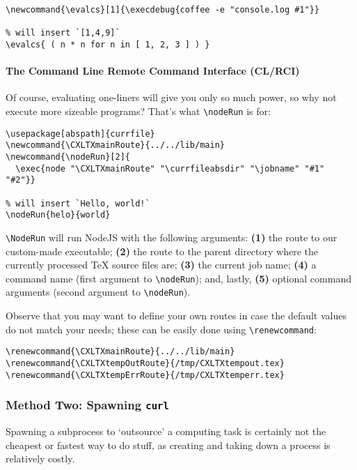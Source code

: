\begin{verbatim}
\newcommand{\evalcs}[1]{\execdebug{coffee -e "console.log #1"}}

% will insert `[1,4,9]`
\evalcs{ ( n * n for n in [ 1, 2, 3 ] ) }
\end{verbatim}

\paragraph{The Command Line Remote Command Interface
(CL/RCI)}\label{the-command-line-remote-command-interface-clrci}

Of course, evaluating one-liners will give you only so much power, so
why not execute more sizeable programs? That's what
\texttt{\textbackslash{}nodeRun} is for:

\begin{verbatim}
\usepackage[abspath]{currfile}
\newcommand{\CXLTXmainRoute}{../../lib/main}
\newcommand{\nodeRun}[2]{
  \exec{node "\CXLTXmainRoute" "\currfileabsdir" "\jobname" "#1" "#2"}}

% will insert `Hello, world!`
\nodeRun{helo}{world}
\end{verbatim}

\texttt{\textbackslash{}NodeRun} will run NodeJS with the following
arguments: \textbf{(1)} the route to our custom-made executable;
\textbf{(2)} the route to the parent directory where the currently
processed TeX source files are; \textbf{(3)} the current job name;
\textbf{(4)} a command name (first argument to
\texttt{\textbackslash{}nodeRun}); and, lastly, \textbf{(5)} optional
command arguments (second argument to \texttt{\textbackslash{}nodeRun}).

Observe that you may want to define your own routes in case the default
values do not match your needs; these can be easily done using
\texttt{\textbackslash{}renewcommand}:

\begin{verbatim}
\renewcommand{\CXLTXmainRoute}{../../lib/main}
\renewcommand{\CXLTXtempOutRoute}{/tmp/CXLTXtempout.tex}
\renewcommand{\CXLTXtempErrRoute}{/tmp/CXLTXtemperr.tex}
\end{verbatim}

\subsubsection{Method Two: Spawning
\texttt{curl}}\label{method-two-spawning-curl}

Spawning a subprocess to `outsource' a computing task is certainly not
the cheapest or fastest way to do stuff, as creating and taking down a
process is relatively costly.


